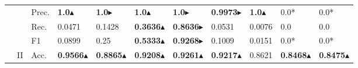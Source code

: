 \begin{tabular}{cclllllllll}
    \multicolumn{1}{l}{}                                                                                       &                                   & Prec.                                                & \textbf{1.0}$\blacktriangle$                      & \textbf{1.0}$\blacktriangleright$                      & \textbf{1.0}$\blacktriangle$                & \textbf{1.0}$\blacktriangleright$             & \textbf{0.9973}$\blacktriangleright$                                                               & \textbf{1.0}$\blacktriangle$                                                               & 0.0*                                      & 0.0*                                      \\
    \multicolumn{1}{l}{}                                                                                       &                                   & Rec.                                                 & 0.0471                  & 0.1428                  & \textbf{0.3636}$\blacktriangle$             & \textbf{0.8636}$\blacktriangleright$          & 0.0531                                                                       & 0.0076                                                                      & 0.0                                       & 0.0                                       \\
    \multicolumn{1}{l}{}                                                                                       &                                   & F1                                                   & 0.0899                  & 0.25                    & \textbf{0.5333}$\blacktriangle$             & \textbf{0.9268}$\blacktriangleright$          & 0.1009                                                                       & 0.0151                                                                      & 0.0*                                      & 0.0*                                      \\ 
    \cmidrule{2-11}
    \multicolumn{1}{l}{}                                                                                       & \multirow{4}{*}{II}               & Acc.                                                 & \textbf{0.9566}$\blacktriangle$        & \textbf{0.8865}$\blacktriangle$        & \textbf{0.9208}$\blacktriangle$             & \textbf{0.9261}$\blacktriangle$        & \textbf{0.9217}$\blacktriangle$                                                             & 0.8621                                                                      & \textbf{0.8468}$\blacktriangle$                          & \textbf{0.8475}$\blacktriangle$                          \\

\end{tabular}
